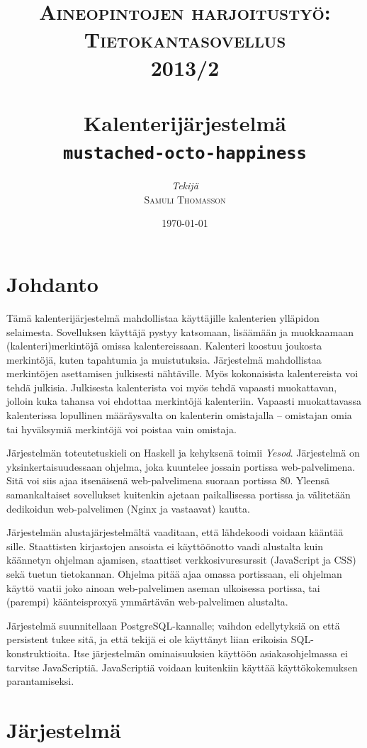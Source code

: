 \documentclass[a4paper,12pt]{report}
\title{%
   \vspace{3cm}
   \textsc{\large Aineopintojen harjoitustyö: Tietokantasovellus \\ 2013/2\\}
   \HRule\\
   \textbf{\huge Kalenterijärjestelmä \\}
   \texttt{\large mustached-octo-happiness \\}
   \HRule
}
\author{%
   \begin{minipage}{0.95\textwidth}
      \begin{flushright}
         \large \emph{Tekijä}\\
         \large \textsc{Samuli Thomasson}
      \end{flushright}
   \end{minipage}
}
\date{\vfill \today}
\begin{document}

\maketitle
\tableofcontents
\chapter{Johdanto}
Tämä kalenterijärjestelmä mahdollistaa käyttäjille kalenterien yllä\-pidon
selaimesta.  Sovelluksen käyttäjä pystyy katsomaan, lisäämään
ja muokkaamaan (kalenteri)merkintöjä omissa kalentereissaan.  Kalenteri koostuu
joukosta merkintöjä, kuten tapahtumia ja muistutuksia.  Järjestelmä mahdollistaa
merkintöjen asettamisen julkisesti nähtäville. Myös kokonaisista kalentereista
voi tehdä julkisia. Julkisesta kalenterista voi myös tehdä vapaasti muokattavan,
jolloin kuka tahansa voi ehdottaa merkintöjä kalenteriin. Vapaasti muokattavassa
kalenterissa lopullinen määräysvalta on kalenterin omistajalla -- omistajan omia
tai hyväksymiä merkintöjä voi poistaa vain omistaja.

Järjestelmän toteutetuskieli on Haskell ja kehyksenä toimii \emph{Yesod}.
Järjestelmä on yksinkertaisuudessaan ohjelma, joka kuuntelee jossain portissa
web-palvelimena. Sitä voi siis ajaa itsenäisenä web-palvelimena suoraan portissa
80. Yleensä samankaltaiset sovellukset kuitenkin ajetaan paikallisessa portissa
ja välitetään dedikoidun web-palvelimen (Nginx ja vastaavat) kautta.

Järjestelmän alustajärjestelmältä vaaditaan, että lähdekoodi voidaan kääntää
sille. Staattisten kirjastojen ansoista ei käyttöönotto vaadi alustalta kuin
käännetyn ohjelman ajamisen, staattiset verkkosivuresurssit (JavaScript ja CSS)
sekä tuetun tietokannan. Ohjelma pitää ajaa omassa portissaan, eli ohjelman
käyttö vaatii joko ainoan web-palvelimen aseman ulkoisessa portissa, tai
(parempi) käänteisproxyä ymmärtävän web-palvelimen alustalta.

Järjestelmä suunnitellaan PostgreSQL-kannalle; vaihdon edellytyksiä on että
persistent tukee sitä, ja että tekijä ei ole käyttänyt liian erikoisia
SQL-konstruktioita.  Itse järjestelmän ominaisuuksien käyttöön asiakasohjelmassa
ei tarvitse JavaScriptiä. JavaScriptiä voidaan kuitenkiin käyttää
käyttökokemuksen parantamiseksi.

\chapter{Järjestelmä}
\end{document}
